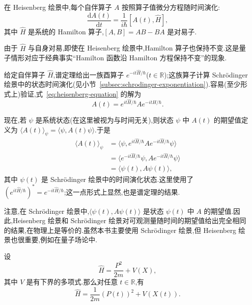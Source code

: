 \begin{definition}[Heisenberg 绘景]\label{def:heisenberg-picture}
在 Heisenberg 绘景中,每个自伴算子 \(A\) 按照算子值微分方程随时间演化:
\begin{equation}
\frac{\mathrm{d}A(t)}{\mathrm{d}t}
=\frac{1}{i\hbar}[A(t),\widehat H],
\label{eq:heisenberg-equation}
\end{equation}
其中 \(\widehat H\) 是系统的 Hamilton 算子,\([A,B]=AB-BA\) 是对易子.
\end{definition}

由于 \(\widehat H\) 与自身对易,即使在 Heisenberg 绘景中,Hamilton 算子也保持不变.这是量子情形对应于经典事实“Hamilton 函数沿 Hamilton 方程保持不变”的现象.

给定自伴算子 \(\widehat H\),谱定理给出一族酉算子 \(e^{-it\widehat H/\hbar}\)(\(t\in\mathbb{R}\));这族算子计算 Schrödinger 绘景中的状态时间演化(见小节~\ref{subsec:schrodinger-exponentiation}).容易(至少形式上)验证,式~\eqref{eq:heisenberg-equation} 的解为
\begin{equation}
A(t)=e^{it\widehat H/\hbar}Ae^{-it\widehat H/\hbar}.
\label{eq:heisenberg-solution}
\end{equation}

现在,若 \(\psi\) 是系统状态(在这里被视为与时间无关),则状态 \(\psi\) 中 \(A(t)\) 的期望值定义为 \(\langle A(t)\rangle_{\psi}=\langle\psi,A(t)\psi\rangle\).于是
\[
\begin{aligned}
\langle A(t)\rangle_{\psi}
&=\langle\psi,e^{it\widehat H/\hbar}Ae^{-it\widehat H/\hbar}\psi\rangle\\
&=\langle e^{-it\widehat H/\hbar}\psi,Ae^{-it\widehat H/\hbar}\psi\rangle\\
&=\langle\psi(t),A\psi(t)\rangle,
\end{aligned}
\]
其中 \(\psi(t)\) 是 Schrödinger 绘景中的时间演化状态.这里使用了 \((e^{it\widehat H/\hbar})^{*}=e^{-it\widehat H/\hbar}\);这一点形式上显然,也是谱定理的结果.

注意,在 Schrödinger 绘景中,\(\langle\psi(t),A\psi(t)\rangle\) 是状态 \(\psi(t)\) 中 \(A\) 的期望值.因此,Heisenberg 绘景和 Schrödinger 绘景对可观测量随时间的期望值给出完全相同的结果,在物理上是等价的.虽然本书主要使用 Schrödinger 绘景,但 Heisenberg 绘景也很重要,例如在量子场论中.

\begin{proposition}\label{prop:heisenberg-hamiltonian}
设
\[
\widehat H=\frac{P^{2}}{2m}+V(X),
\]
其中 \(V\) 是有下界的多项式.那么对任意 \(t\in\mathbb{R}\),有
\begin{equation}
\widehat H=\frac{1}{2m}(P(t))^{2}+V(X(t)).
\label{eq:heisenberg-hamiltonian}
\end{equation}
\end{proposition}

